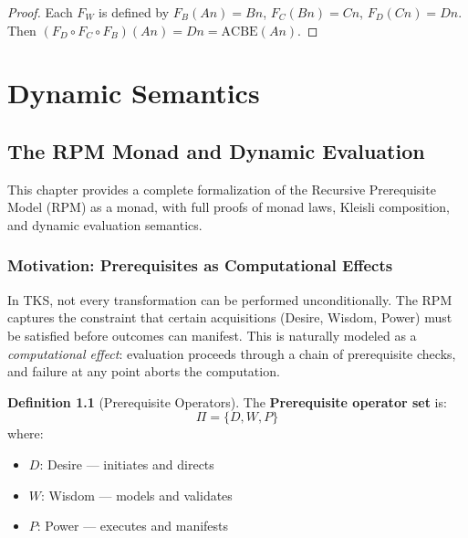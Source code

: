 \documentclass[11pt,twoside,openright]{book}
\theoremstyle{definition}
\newtheorem{definition}{Definition}[chapter]
\theoremstyle{plain}
\theoremstyle{remark}
\begin{document}
\begin{proof}
Each $F_W$ is defined by $F_B(An) = Bn$, $F_C(Bn) = Cn$, $F_D(Cn) = Dn$.
Then $(F_D \circ F_C \circ F_B)(An) = Dn = \mathrm{ACBE}(An)$.
\end{proof}

\part{Dynamic Semantics}

\chapter{The RPM Monad and Dynamic Evaluation}
\label{ch:rpm-monad}

\begin{tcolorbox}[colback=green!5!white,colframe=green!75!black,title=New in v6.1]
This chapter provides a complete formalization of the Recursive Prerequisite Model (RPM) as a monad, with full proofs of monad laws, Kleisli composition, and dynamic evaluation semantics.
\end{tcolorbox}

\section{Motivation: Prerequisites as Computational Effects}

In TKS, not every transformation can be performed unconditionally. The RPM captures the constraint that certain acquisitions (Desire, Wisdom, Power) must be satisfied before outcomes can manifest. This is naturally modeled as a \emph{computational effect}: evaluation proceeds through a chain of prerequisite checks, and failure at any point aborts the computation.

\begin{definition}[Prerequisite Operators]
\label{def:prereq-ops}
The \textbf{Prerequisite operator set} is:
\[
\Pi = \{D, W, P\}
\]
where:
\begin{itemize}
  \item $D$: Desire --- initiates and directs
  \item $W$: Wisdom --- models and validates
  \item $P$: Power --- executes and manifests
\end{itemize}
\end{definition}
\end{document}
